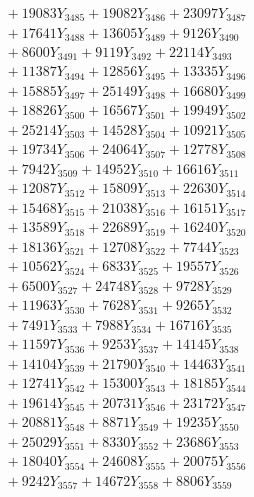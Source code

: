 \documentclass[a4paper,10pt]{article}
\begin{document}
{\begin{align}
&\;  + 19083 Y_{3485} + 19082 Y_{3486} + 23097 Y_{3487} \\[0.3ex]
&\;  + 17641 Y_{3488} + 13605 Y_{3489} + 9126 Y_{3490} \\[0.3ex]
&\;  + 8600 Y_{3491} + 9119 Y_{3492} + 22114 Y_{3493} \\[0.3ex]
&\;  + 11387 Y_{3494} + 12856 Y_{3495} + 13335 Y_{3496} \\[0.3ex]
&\;  + 15885 Y_{3497} + 25149 Y_{3498} + 16680 Y_{3499} \\[0.3ex]
&\;  + 18826 Y_{3500} + 16567 Y_{3501} + 19949 Y_{3502} \\[0.3ex]
&\;  + 25214 Y_{3503} + 14528 Y_{3504} + 10921 Y_{3505} \\[0.3ex]
&\;  + 19734 Y_{3506} + 24064 Y_{3507} + 12778 Y_{3508} \\[0.5ex]\allowbreak
&\;  + 7942 Y_{3509} + 14952 Y_{3510} + 16616 Y_{3511} \\[0.3ex]
&\;  + 12087 Y_{3512} + 15809 Y_{3513} + 22630 Y_{3514} \\[0.3ex]
&\;  + 15468 Y_{3515} + 21038 Y_{3516} + 16151 Y_{3517} \\[0.3ex]
&\;  + 13589 Y_{3518} + 22689 Y_{3519} + 16240 Y_{3520} \\[0.3ex]
&\;  + 18136 Y_{3521} + 12708 Y_{3522} + 7744 Y_{3523} \\[0.3ex]
&\;  + 10562 Y_{3524} + 6833 Y_{3525} + 19557 Y_{3526} \\[0.3ex]
&\;  + 6500 Y_{3527} + 24748 Y_{3528} + 9728 Y_{3529} \\[0.3ex]
&\;  + 11963 Y_{3530} + 7628 Y_{3531} + 9265 Y_{3532} \\[0.3ex]
&\;  + 7491 Y_{3533} + 7988 Y_{3534} + 16716 Y_{3535} \\[0.3ex]
&\;  + 11597 Y_{3536} + 9253 Y_{3537} + 14145 Y_{3538} \\[0.5ex]\allowbreak
&\;  + 14104 Y_{3539} + 21790 Y_{3540} + 14463 Y_{3541} \\[0.3ex]
&\;  + 12741 Y_{3542} + 15300 Y_{3543} + 18185 Y_{3544} \\[0.3ex]
&\;  + 19614 Y_{3545} + 20731 Y_{3546} + 23172 Y_{3547} \\[0.3ex]
&\;  + 20881 Y_{3548} + 8871 Y_{3549} + 19235 Y_{3550} \\[0.3ex]
&\;  + 25029 Y_{3551} + 8330 Y_{3552} + 23686 Y_{3553} \\[0.3ex]
&\;  + 18040 Y_{3554} + 24608 Y_{3555} + 20075 Y_{3556} \\[0.3ex]
&\;  + 9242 Y_{3557} + 14672 Y_{3558} + 8806 Y_{3559} \\[0.3ex]

\end{align}}
\end{document}
